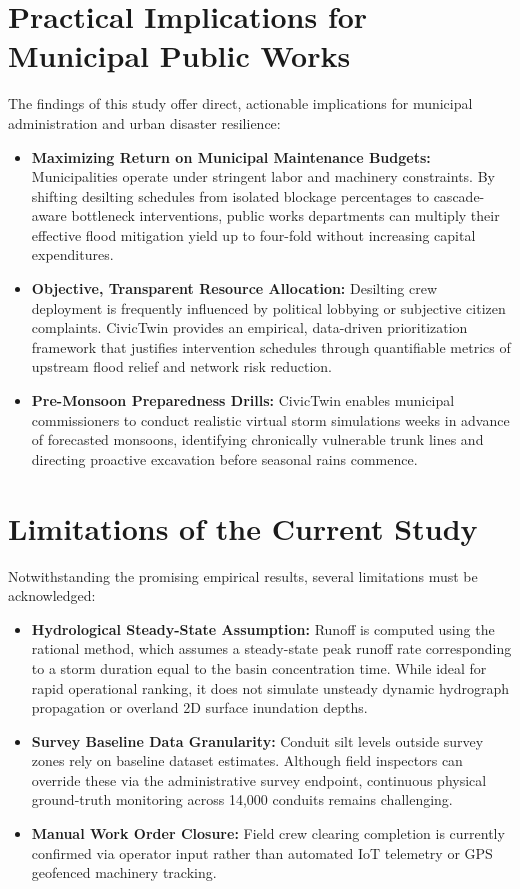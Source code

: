 \section{Practical Implications for Municipal Public Works}
The findings of this study offer direct, actionable implications for municipal administration and urban disaster resilience:
\begin{itemize}
    \item \textbf{Maximizing Return on Municipal Maintenance Budgets:} Municipalities operate under stringent labor and machinery constraints. By shifting desilting schedules from isolated blockage percentages to cascade-aware bottleneck interventions, public works departments can multiply their effective flood mitigation yield up to four-fold without increasing capital expenditures.
    \item \textbf{Objective, Transparent Resource Allocation:} Desilting crew deployment is frequently influenced by political lobbying or subjective citizen complaints. CivicTwin provides an empirical, data-driven prioritization framework that justifies intervention schedules through quantifiable metrics of upstream flood relief and network risk reduction.
    \item \textbf{Pre-Monsoon Preparedness Drills:} CivicTwin enables municipal commissioners to conduct realistic virtual storm simulations weeks in advance of forecasted monsoons, identifying chronically vulnerable trunk lines and directing proactive excavation before seasonal rains commence.
\end{itemize}

\section{Limitations of the Current Study}
Notwithstanding the promising empirical results, several limitations must be acknowledged:
\begin{itemize}
    \item \textbf{Hydrological Steady-State Assumption:} Runoff is computed using the rational method, which assumes a steady-state peak runoff rate corresponding to a storm duration equal to the basin concentration time. While ideal for rapid operational ranking, it does not simulate unsteady dynamic hydrograph propagation or overland 2D surface inundation depths.
    \item \textbf{Survey Baseline Data Granularity:} Conduit silt levels outside survey zones rely on baseline dataset estimates. Although field inspectors can override these via the administrative survey endpoint, continuous physical ground-truth monitoring across 14,000 conduits remains challenging.
    \item \textbf{Manual Work Order Closure:} Field crew clearing completion is currently confirmed via operator input rather than automated IoT telemetry or GPS geofenced machinery tracking.
\end{itemize}

